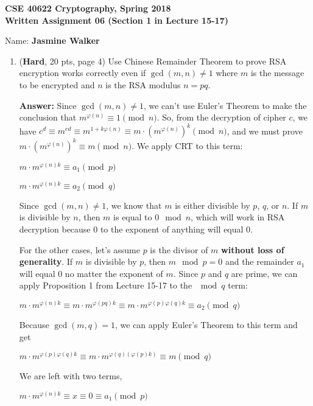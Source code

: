 \documentclass[10pt]{article}
\begin{document}






\begin{center}
	\textbf{CSE 40622 Cryptography, Spring 2018\\Written Assignment 06 (Section 1 in Lecture 15-17)}
\end{center}


Name: \textbf{Jasmine Walker}




\begin{enumerate}
	\item (\textbf{Hard}, 20 pts, page 4) Use Chinese Remainder Theorem to prove RSA encryption works correctly even if $\gcd(m, n) \neq
	1$ where $m$ is the message to be encrypted and $n$ is the RSA modulus $n = pq$.
	
	\textbf{Answer:} \newline Since $\gcd(m, n) \neq 1$, we can't use Euler's Theorem to make the conclusion that $m^{\varphi(n)} \equiv 1 \pmod n$. So, from the decryption of cipher $c$, we have $c^d \equiv m^{ed} \equiv m^{1+k\varphi(n)} \equiv m\cdot(m^{\varphi(n)})^k \pmod n$, and we must prove $m\cdot(m^{\varphi(n)})^k \equiv m \pmod n$. We apply CRT to this term: 
    \begin{center}
    $m\cdot m^{\varphi(n)k} \equiv a_1 \pmod p$
    
    $m\cdot m^{\varphi(n)k} \equiv a_2 \pmod q$
    \end{center}
    Since $\gcd(m, n) \neq 1$, we know that $m$ is either divisible by $p$, $q$, or $n$. If $m$ is divisible by $n$, then $m$ is equal to $0 \mod n$, which will work in RSA decryption because $0$ to the exponent of anything will equal $0$.
    
    For the other cases, let's assume $p$ is the divisor of $m$ \textbf{without loss of generality}. If $m$ is divisible by $p$, then $m \mod p = 0$ and the remainder $a_1$ will equal $0$ no matter the exponent of $m$. Since $p$ and $q$ are prime, we can apply Proposition 1 from Lecture 15-17 to the $\mod q$ term:
    \begin{center}
    $m\cdot m^{\varphi(n)k} \equiv m\cdot m^{\varphi(pq)k} \equiv m\cdot m^{\varphi(p)\varphi(q)k} \equiv a_2 \pmod q$
    \end{center}
    Because $\gcd(m,q) = 1$, we can apply Euler's Theorem to this term and get 
    \begin{center}
    $m\cdot m^{\varphi(p)\varphi(q)k} \equiv m\cdot m^{\varphi(q)(\varphi(p)k)} \equiv m \pmod q$
    \end{center}
    We are left with two terms, 
    \begin{center}
    $m\cdot m^{\varphi(n)k} \equiv x \equiv 0 \equiv a_1 \pmod p$
    

\end{center}
\end{enumerate}
\end{document}
